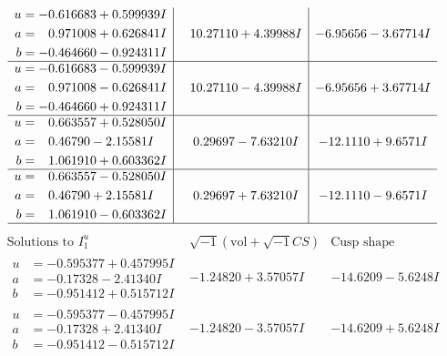 \documentclass[1p]{elsarticle_modified}
\theoremstyle{definition}
\newcommand{\I}{\sqrt{-1}}
\begin{document}
$$\begin{array}{c|c|c}
\begin{aligned}
u &= -0.616683 + 0.599939 I \\
a &= \phantom{-}0.971008 + 0.626841 I \\
b &= -0.464660 - 0.924311 I\end{aligned}
 & \phantom{-}10.27110 + 4.39988 I & -6.95656 - 3.67714 I \\ \hline\begin{aligned}
u &= -0.616683 - 0.599939 I \\
a &= \phantom{-}0.971008 - 0.626841 I \\
b &= -0.464660 + 0.924311 I\end{aligned}
 & \phantom{-}10.27110 - 4.39988 I & -6.95656 + 3.67714 I \\ \hline\begin{aligned}
u &= \phantom{-}0.663557 + 0.528050 I \\
a &= \phantom{-}0.46790 - 2.15581 I \\
b &= \phantom{-}1.061910 + 0.603362 I\end{aligned}
 & \phantom{-}0.29697 - 7.63210 I & -12.1110 + 9.6571 I \\ \hline\begin{aligned}
u &= \phantom{-}0.663557 - 0.528050 I \\
a &= \phantom{-}0.46790 + 2.15581 I \\
b &= \phantom{-}1.061910 - 0.603362 I\end{aligned}
 & \phantom{-}0.29697 + 7.63210 I & -12.1110 - 9.6571 I\\
 \hline 
 \end{array}$$\newpage$$\begin{array}{c|c|c}  
\text{Solutions to }I^u_{1}& \I (\text{vol} + \sqrt{-1}CS) & \text{Cusp shape}\\
 \hline 
\begin{aligned}
u &= -0.595377 + 0.457995 I \\
a &= -0.17328 - 2.41340 I \\
b &= -0.951412 + 0.515712 I\end{aligned}
 & -1.24820 + 3.57057 I & -14.6209 - 5.6248 I \\ \hline\begin{aligned}
u &= -0.595377 - 0.457995 I \\
a &= -0.17328 + 2.41340 I \\
b &= -0.951412 - 0.515712 I\end{aligned}
 & -1.24820 - 3.57057 I & -14.6209 + 5.6248 I \\ \hline\begin{aligned}

\end{aligned}
\end{array}$$
\end{document}
